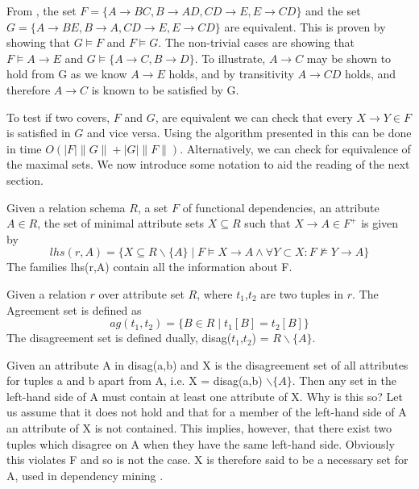 \begin{example}
\begin{rm}
From \cite{mr92}, the set $F = \{ A \to BC, B \to AD, CD \to E, E \to CD \}$ and the set  $G = \{ A \to BE, B \to A, CD \to E, E \to CD \}$ are equivalent. This is proven by showing that $G \models F$ and $F \models G$.  The non-trivial
cases are showing that $F \models A \to E$ and $G \models \{ A \to C, B \to D \}$. To illustrate, $A \to C$ may be shown to hold from G as we know $A \to E$ holds, and by transitivity $A \to CD$ holds, and therefore $A \to C$ is known to be satisfied by G.
\end{rm}
\end{example}

To test if two covers, $F$ and $G$, are equivalent we can check that
every $X \to Y \in F$ is satisfied in $G$ and vice versa.  Using the
algorithm presented in \cite{mr92} this can be done in time $O( \mid F
\mid \| G \| + \mid G \mid \| F \|)$. Alternatively, we can check for
equivalence of the maximal sets. We now introduce some notation to aid
the reading of the next section.

\begin{definition}
\begin{rm}
Given a relation schema $R$, a set $F$ of functional dependencies, an
attribute $A \in R$, the set of minimal attribute sets $X \subseteq R$
such that $X \to A \in F^+$ is given by
\begin{displaymath}
lhs(r,A) = \{ X \subseteq R\backslash \{ A \} \mid F \models X \to A \wedge \forall Y \subset
 X: F \not\models Y \to A \}
\end{displaymath}
The families lhs(r,A) contain all the information about F.
\end{rm}
\end{definition}

\begin{definition}
\begin{rm}
Given a relation $r$ over attribute set $R$, where $t_1$,$t_2$ are
two tuples in $r$. The Agreement set is defined as
\begin{displaymath}
ag(t_1, t_2) = \{ B \in R \mid t_1[B] = t_2[B] \}
\end{displaymath}
The disagreement set is defined dually, disag($t_1$,$t_2$) = $R \backslash \{ A \} $.
\end{rm}
\end{definition}

Given an attribute A in disag(a,b) and X is the disagreement set of all
attributes for tuples a and b apart from A, i.e. X = disag(a,b) $\backslash \{ A \}$.  
Then any set in the left-hand side of A must contain at least one
attribute of X. Why is this so?  Let us assume that it does not hold and
that for a member of the left-hand side of A an attribute of X is not
contained.  This implies, however, that there exist two tuples which disagree
on A when they have the same left-hand side.  Obviously this violates F and so is
not the case. X is therefore said to be a necessary set for A, used in
dependency mining \cite{Mann92}.

